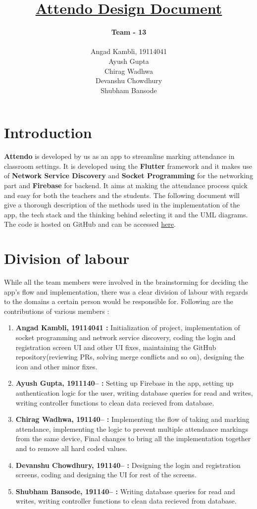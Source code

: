 \documentclass{article}
\title{\textbf{\underline{Attendo Design Document}}}
\author{
\textbf{Team - 13} \\
\\ Angad Kambli, 19114041\\ 
Ayush Gupta \\ 
Chirag Wadhwa \\ 
Devanshu Chowdhury \\ 
Shubham Bansode \\ }
\date{}
\begin{document}
\maketitle
\tableofcontents
\newpage

\section{Introduction}
\textbf{Attendo} is developed by us as an app to streamline marking attendance in classroom settings. It is developed using the \textbf{Flutter} framework and it makes use of \textbf{Network Service Discovery} and \textbf{Socket Programming} for the networking part and \textbf{Firebase} for backend. It aims at making the attendance process quick and easy for both the teachers and the students. The following document will give a thorough description of the methods used in the implementation of the app, the tech stack and the thinking behind selecting it and the UML diagrams. The code is hosted on GitHub and can be accessed \href{https://github.com/Attendo-App/Attendo}{here}.

\section{Division of labour}
While all the team members were involved in the brainstorming for deciding the app's flow and implementation, there was a clear division of labour with regards to the domains a certain person would be responsible for. Following are the contributions of various members :
\begin{enumerate}
    \item \textbf{Angad Kambli, 19114041 :} Initialization of project, implementation of socket programming and network service discovery, coding the login and registration screen UI and other UI fixes, maintaining the GitHub repository(reviewing PRs, solving merge conflicts and so on), designing the icon and other minor fixes.
    \item \textbf{Ayush Gupta, 1911140-- : } Setting up Firebase in the app, setting up authentication logic for the user, writing database queries for read and writes, writing controller functions to clean data recieved from database.
    \item \textbf{Chirag Wadhwa, 191140-- : } Implementing the flow of taking and marking attendance, implementing the logic to prevent multiple attendance markings from the same device, Final changes to bring all the implementation together and to remove all hard coded values.
    \item \textbf{Devanshu Chowdhury, 191140-- : } Designing the login and registration screens, coding and designing the UI for rest of the screens.
    \item \textbf{Shubham Bansode, 191140-- : }  Writing database queries for read and writes, writing controller functions to clean data recieved from database.
    
\end{enumerate}
\end{document}
